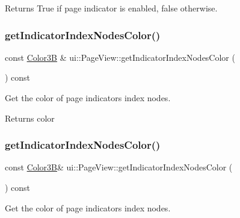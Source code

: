 \begin{DoxyReturn}{Returns}
True if page indicator is enabled, false otherwise. 
\end{DoxyReturn}
\mbox{\label{classui_1_1PageView_acb97654798e343a86517ac058655cdd9}} 
\subsubsection{\texorpdfstring{get\+Indicator\+Index\+Nodes\+Color()}{getIndicatorIndexNodesColor()}\hspace{0.1cm}{\footnotesize\ttfamily [1/2]}}
{\footnotesize\ttfamily const \hyperlink{structColor3B}{Color3B} \& ui\+::\+Page\+View\+::get\+Indicator\+Index\+Nodes\+Color (\begin{DoxyParamCaption}{ }\end{DoxyParamCaption}) const}



Get the color of page indicator\textquotesingle{}s index nodes. 

\begin{DoxyReturn}{Returns}
color 
\end{DoxyReturn}
\mbox{\label{classui_1_1PageView_a7754d19d8e93f9654f2dc6a58e15131b}} 
\subsubsection{\texorpdfstring{get\+Indicator\+Index\+Nodes\+Color()}{getIndicatorIndexNodesColor()}\hspace{0.1cm}{\footnotesize\ttfamily [2/2]}}
{\footnotesize\ttfamily const \hyperlink{structColor3B}{Color3B}\& ui\+::\+Page\+View\+::get\+Indicator\+Index\+Nodes\+Color (\begin{DoxyParamCaption}{ }\end{DoxyParamCaption}) const}



Get the color of page indicator\textquotesingle{}s index nodes. 

